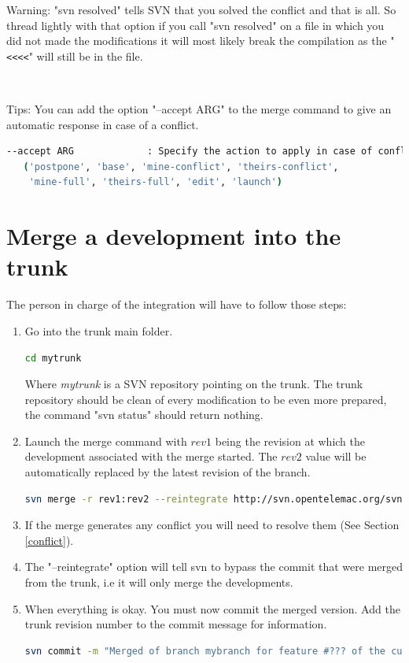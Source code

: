 \begin{WarningBlock}{Warning:}
"svn resolved" tells SVN that you solved the conflict and that is all. So
thread lightly with that option if you call "svn resolved" on a file in which you
did not made the modifications it will most likely break the compilation as the
"\verb!<<<<!" will still be in the file.\\
\end{WarningBlock}
\\
%
\begin{CommentBlock}{Tips:}
You can add the option "--accept ARG" to the merge command to give an automatic
response in case of a conflict.
\begin{lstlisting}[language=bash]
 --accept ARG             : Specify the action to apply in case of conflicts
   ('postpone', 'base', 'mine-conflict', 'theirs-conflict', 
    'mine-full', 'theirs-full', 'edit', 'launch')
\end{lstlisting}
\end{CommentBlock}
%
\section{Merge a development into the trunk}
%
The person in charge of the integration will have to follow those steps:
\begin{enumerate}
\item Go into the trunk main folder.
\begin{lstlisting}[language=bash]
cd mytrunk
\end{lstlisting}
Where \textit{mytrunk} is a SVN repository pointing on the trunk. The trunk
repository should be clean of every modification to be even more prepared, the
command "svn status" should return nothing.
\item Launch the merge command with $rev1$ being the revision at which the
development associated with the merge started. The $rev2$ value will be
automatically replaced by the latest revision of the branch. 
\begin{lstlisting}[language=bash]
svn merge -r rev1:rev2 --reintegrate http://svn.opentelemac.org/svn/opentelemac/branches/mybranch .
\end{lstlisting}
\item If the merge generates any conflict you will need to resolve them (See
Section \ref{conflict}).
\item The "--reintegrate" option will tell svn to bypass the commit that were
merged from the trunk, i.e it will only merge the developments.
\item When everything is okay. You must now commit the merged version. Add the
trunk revision number to the commit message for information.
\begin{lstlisting}[language=bash]
svn commit -m "Merged of branch mybranch for feature #??? of the cue"
\end{lstlisting}
\end{enumerate}
%
